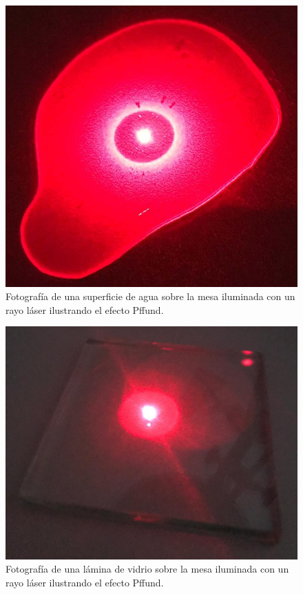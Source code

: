 \documentclass[12pt]{article}
\numberwithin{table}{section}
\numberwithin{figure}{section}
\numberwithin{equation}{section}
\begin{document}
\begin{figure}[!ht]
	\small \centering \sffamily
	\begin{center}
		\includegraphics[scale = 0.15]{P2PffAgua.jpeg}
		\caption{Fotografía de una superficie de agua sobre la mesa iluminada con un rayo láser ilustrando el efecto Pffund.}
		\label{P2PffFotoAgua}
	\end{center}
\end{figure}

\begin{figure}[!ht]
	\small \centering \sffamily
	\begin{center}
		\includegraphics[scale = 0.15]{P2PffVidrio.jpeg}
		\caption{Fotografía de una lámina de vidrio sobre la mesa iluminada con un rayo láser ilustrando el efecto Pffund.}
		\label{P2PffFotoVidrio}
	\end{center}
\end{figure}
\end{document}
